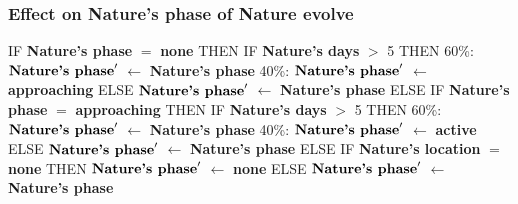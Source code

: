 \documentclass{article}%
\begin{document}
\subsubsection{Effect on Nature's phase of Nature evolve}%
\label{ssubsec:Effect on Nature's phase of Nature evolve}%
\begin{flushleft}%
IF %
\textbf{Nature's phase}%
$=$%
\textbf{none}%
\linebreak%
\hspace*{2em}%
THEN %
IF %
\textbf{Nature's days}%
$>$%
5%
\linebreak%
\hspace*{4em}%
THEN %
\linebreak%
\hspace*{6em}%
60\%: %
$\mbox{\textbf{Nature's phase}} '$%
$\leftarrow$%
\textbf{Nature's phase}%
\linebreak%
\hspace*{6em}%
40\%: %
$\mbox{\textbf{Nature's phase}} '$%
$\leftarrow$%
\textbf{approaching}%
\linebreak%
\hspace*{4em}%
ELSE %
$\mbox{\textbf{Nature's phase}} '$%
$\leftarrow$%
\textbf{Nature's phase}%
\linebreak%
\hspace*{2em}%
ELSE %
IF %
\textbf{Nature's phase}%
$=$%
\textbf{approaching}%
\linebreak%
\hspace*{4em}%
THEN %
IF %
\textbf{Nature's days}%
$>$%
5%
\linebreak%
\hspace*{6em}%
THEN %
\linebreak%
\hspace*{8em}%
60\%: %
$\mbox{\textbf{Nature's phase}} '$%
$\leftarrow$%
\textbf{Nature's phase}%
\linebreak%
\hspace*{8em}%
40\%: %
$\mbox{\textbf{Nature's phase}} '$%
$\leftarrow$%
\textbf{active}%
\linebreak%
\hspace*{6em}%
ELSE %
$\mbox{\textbf{Nature's phase}} '$%
$\leftarrow$%
\textbf{Nature's phase}%
\linebreak%
\hspace*{4em}%
ELSE %
IF %
\textbf{Nature's location}%
$=$%
\textbf{none}%
\linebreak%
\hspace*{6em}%
THEN %
$\mbox{\textbf{Nature's phase}} '$%
$\leftarrow$%
\textbf{none}%
\linebreak%
\hspace*{6em}%
ELSE %
$\mbox{\textbf{Nature's phase}} '$%
$\leftarrow$%
\textbf{Nature's phase}%
\end{flushleft}
\end{document}
